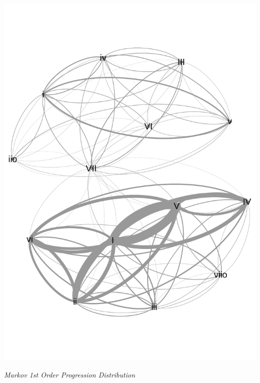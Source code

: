 \documentclass[12pt]{article}
\begin{document}
\begin{center}
\includegraphics[trim = 0 50 0 40, scale=.25]{markov2.pdf}
\end{center}
\begin{center}\emph{Markov 1st Order Progression Distribution}\\ \end{center}
\end{document}

